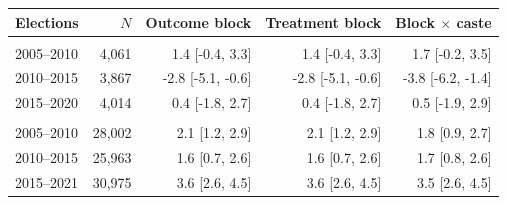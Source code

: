 
\begin{tabular}{lrrrr}
\toprule
Elections & $N$ & Outcome block & Treatment block & Block $\times$ caste\\
\midrule
\addlinespace[0.3em]
\multicolumn{5}{l}{\textbf{Rajasthan}}\\
\hspace{1em}2005--2010 & 4,061 & 1.4 [-0.4, 3.3] & 1.4 [-0.4, 3.3] & 1.7 [-0.2, 3.5]\\
\hspace{1em}2010--2015 & 3,867 & -2.8 [-5.1, -0.6] & -2.8 [-5.1, -0.6] & -3.8 [-6.2, -1.4]\\
\hspace{1em}2015--2020 & 4,014 & 0.4 [-1.8, 2.7] & 0.4 [-1.8, 2.7] & 0.5 [-1.9, 2.9]\\
\addlinespace[0.3em]
\multicolumn{5}{l}{\textbf{Uttar Pradesh}}\\
\hspace{1em}2005--2010 & 28,002 & 2.1 [1.2, 2.9] & 2.1 [1.2, 2.9] & 1.8 [0.9, 2.7]\\
\hspace{1em}2010--2015 & 25,963 & 1.6 [0.7, 2.6] & 1.6 [0.7, 2.6] & 1.7 [0.8, 2.6]\\
\hspace{1em}2015--2021 & 30,975 & 3.6 [2.6, 4.5] & 3.6 [2.6, 4.5] & 3.5 [2.6, 4.5]\\
\bottomrule
\end{tabular}
